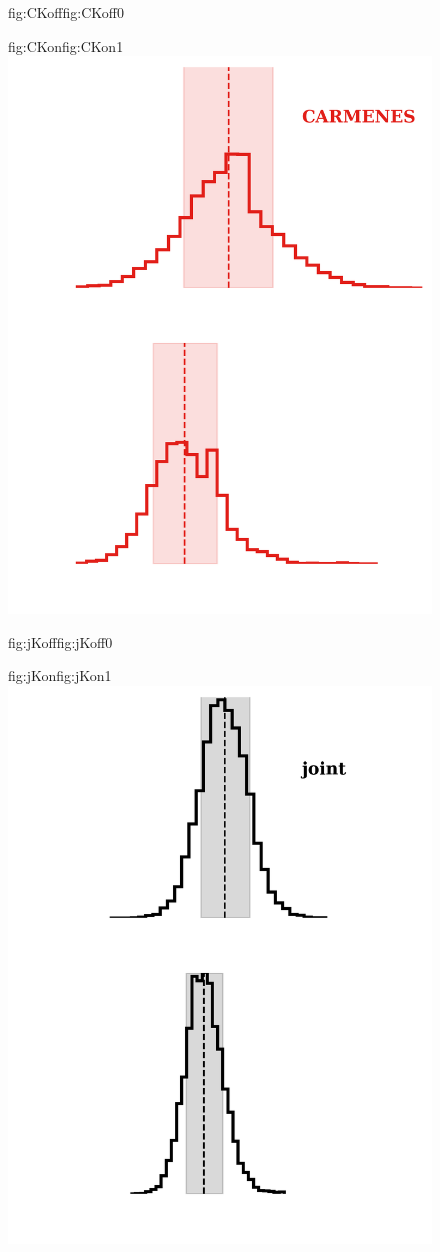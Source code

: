 \begin{figure}
\begin{ocg}{fig:CKoff}{fig:CKoff}{0}
  \end{ocg}%
  \begin{ocg}{fig:CKon}{fig:CKon}{1}%
  \includegraphics[width=0.6\hsize]{figures/Kpdf_C.png}%
  \end{ocg}
  \hspace{-0.6\hsize}%
  \begin{ocg}{fig:jKoff}{fig:jKoff}{0}%
  \end{ocg}%
  \begin{ocg}{fig:jKon}{fig:jKon}{1}%
  \includegraphics[width=0.6\hsize]{figures/Kpdf_j.png}%
  \end{ocg}
  \hspace{-0.6\hsize}%

\end{figure}
